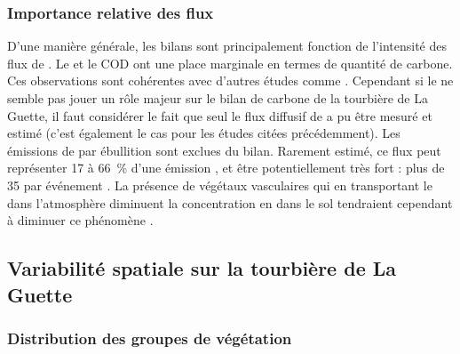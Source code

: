




\subsubsection{Importance relative des flux}

D'une manière générale, les bilans sont principalement fonction de l'intensité des flux de \coo.
Le \chh et le COD ont une place marginale en termes de quantité de carbone.
Ces observations sont cohérentes avec d'autres études comme \citet{bortoluzzi2006a,worrall2009}.
Cependant si le \chh ne semble pas jouer un rôle majeur sur le bilan de carbone de la tourbière de La Guette, il faut considérer le fait que seul le flux diffusif de \chh a pu être mesuré et estimé (c'est également le cas pour les études citées précédemment).
Les émissions de \chh par ébullition sont exclues du bilan.
Rarement estimé, ce flux peut représenter 17 à \SI{66}{\percent} d'une émission \citep{gogo2011,christensen2003}, et être potentiellement très fort : plus de \SI{35}{\gcm} par événement \citep{glaser2009}.
La présence de végétaux vasculaires qui en transportant le \chh dans l'atmosphère diminuent la concentration en \chh dans le sol tendraient cependant à diminuer ce phénomène \citep{chanton2005}.



\subsection{Variabilité spatiale sur la tourbière de La Guette}

\subsubsection{Distribution des groupes de végétation}


